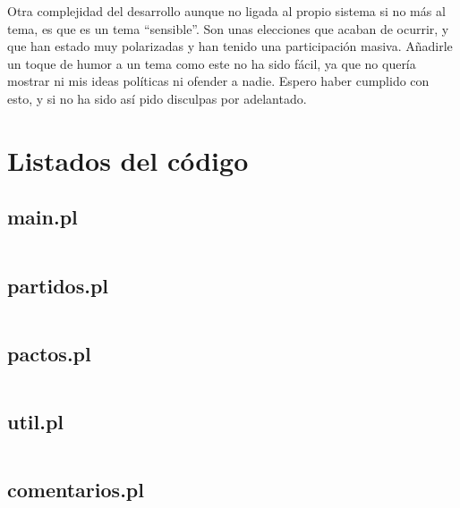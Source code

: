 \documentclass[a4paper, 12pt]{article}
\begin{document}
	Otra complejidad del desarrollo aunque no ligada al propio sistema si no más 
al tema, es que es un tema ``sensible''. Son unas elecciones que acaban de 
ocurrir, y que han estado muy polarizadas y han tenido una participación masiva.
Añadirle un toque de humor a un tema como este no ha sido fácil, ya que no 
quería mostrar ni mis ideas políticas ni ofender a nadie. Espero haber cumplido 
con esto, y si no ha sido así pido disculpas por adelantado. 

\newpage

\section*{Listados del código}

\subsection*{main.pl}
	\inputminted[]{prolog}{../src/main.pl}
\subsection*{partidos.pl}
	\inputminted[]{prolog}{../src/partidos.pl}
\subsection*{pactos.pl}
	\inputminted[]{prolog}{../src/pactos.pl}
\subsection*{util.pl}
	\inputminted[]{prolog}{../src/util.pl}
\subsection*{comentarios.pl}
	\inputminted[]{prolog}{../src/comentarios.pl}
\newpage
\end{document}
